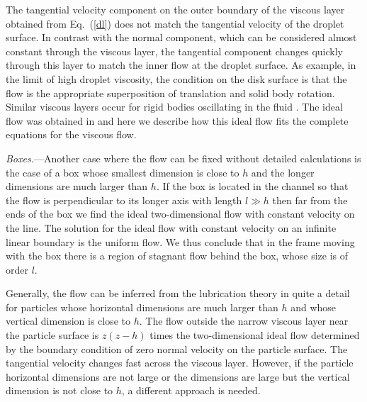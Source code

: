 The tangential velocity component on the outer boundary of the viscous layer obtained from Eq.~(\ref{dl}) does not match the tangential velocity of the droplet surface. In contrast with the normal component, which can be considered almost constant through the viscous layer, the tangential component changes quickly through this layer to match the inner flow at the droplet surface. As example, in the limit of high droplet viscosity, the condition on the disk surface is that the flow is the appropriate superposition of translation and solid body rotation. Similar viscous layers occur for rigid bodies oscillating in the fluid \cite{ll}. The ideal flow was obtained in \cite{tlusty} and here we describe how this ideal flow fits the complete equations for the viscous flow.

{\it Boxes.}---Another case where the flow can be fixed without detailed calculations is the case of a box whose smallest dimension is close to $h$ and the longer dimensions are much larger than $h$. If the box is located in the channel so that the flow is
perpendicular to its longer axis with length $l\gg h$ then far from the ends of the box we find the ideal two-dimensional flow with constant velocity on the line.
The solution for the ideal flow with constant velocity on an infinite linear boundary is the uniform flow. We thus conclude that in the frame moving with the box there is a region of stagnant flow behind the box, whose size is of order $l$.

Generally, the flow can be inferred from the lubrication theory in quite a detail for particles whose horizontal dimensions are much larger than $h$ and whose vertical dimension is close to $h$. The flow outside the narrow viscous layer near the particle surface is $z(z-h)$ times the two-dimensional ideal flow determined by the boundary condition of zero normal velocity on the particle surface. The tangential velocity changes fast across the viscous layer. However, if the particle horizontal dimensions are not large or the dimensions are large but the vertical dimension is not close to $h$, a different approach is needed.

